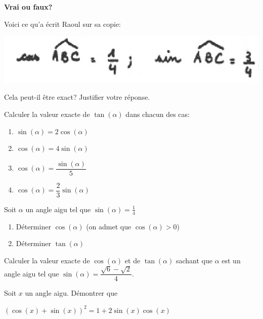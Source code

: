 
\begin{exercice}
\textbf{Vrai ou faux?}

Voici ce qu'a écrit Raoul sur sa copie:

\begin{center}
\includegraphics[scale=0.6]{Trigonometrie/figures/raoul.eps}
\end{center}
Cela peut-il être exact? Justifier votre réponse.
\end{exercice}

\begin{exercice}
Calculer la valeur exacte de $\tan(\alpha)$ dans chacun des cas:

\begin{multicols}{2}
\begin{enumerate}
\item $\sin(\alpha)=2\cos(\alpha)$
\item $\cos(\alpha)=4\sin(\alpha)$
\item $\cos(\alpha)=\dfrac{\sin(\alpha)}{5}$
\item $\cos(\alpha)=\dfrac{2}{3}\sin(\alpha)$
\end{enumerate}
\end{multicols}
\end{exercice}

\begin{exercice}
Soit $\alpha$ un angle aigu tel que $\sin(\alpha)=\frac{1}{4}$
\begin{enumerate}
	\item Déterminer $\cos(\alpha)$ (on admet que $\cos(\alpha)>0$)
	\item Déterminer $\tan(\alpha)$
\end{enumerate}
\end{exercice}

\begin{exercice}
Calculer la valeur exacte de $\cos(\alpha)$ et de $\tan(\alpha)$ sachant que $\alpha$ est un angle aigu tel que $\sin(\alpha)=\dfrac{\sqrt{6}-\sqrt{2}}{4}$.
\end{exercice}

\begin{exercice}
Soit $x$ un angle aigu. Démontrer que 

$(\cos(x)+\sin(x))^2=1+2\sin(x)\cos(x)$
\end{exercice}


